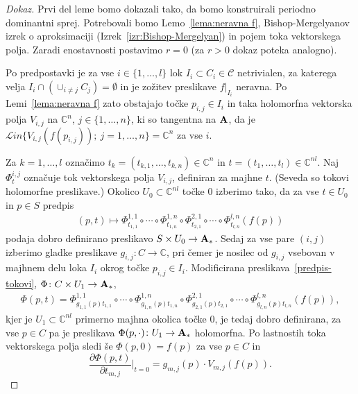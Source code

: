 \documentclass[12pt,a4paper,twoside]{article}
\theoremstyle{definition} %
\newenvironment{dokaz}[1][Dokaz]{\begin{proof}[#1]}{\end{proof}}
\theoremstyle{plain} %
\numberwithin{equation}{section}  %
\newcommand{\C}{\mathbb C}
\begin{document}
\begin{dokaz}
Prvi del leme bomo dokazali tako, da bomo konstruirali periodno dominantni sprej. Potrebovali bomo Lemo~\ref{lema:neravna f}, Bishop-Mergelyanov izrek o aproksimaciji (Izrek~\ref{izr:Bishop-Mergelyan}) in pojem toka vektorskega polja.
Zaradi enostavnosti postavimo $r=0$ (za $r>0$ dokaz poteka analogno).

Po predpostavki je za vse $i \in \{ 1, \dots, l \}$ lok $I_{i} \subset C_{i} \in \mathcal{C}$ netrivialen, za katerega velja $I_{i} \cap (\cup_{i \neq j} C_{j}) = \emptyset$ in je zožitev preslikave $f|_{I_{i}}$ neravna. Po Lemi~\ref{lema:neravna f} zato obstajajo točke $p_{i,j} \in I_{i}$ in taka holomorfna vektorska polja $V_{i,j}$ na $\C^{n}$, $j \in \{1, \dots, n \}$, ki so tangentna na $\textbf{\textup{A}}$, da je $\mathcal{L}in \{ V_{i,j}(f(p_{i,j})) ; \ j = 1, \dots, n \} = \C^{n}$ za vse $i$.

Za $k = 1, \dots , l$ označimo $t_{k} = (t_{k,1}, \dots, t_{k,n}) \in \C^{n}$ in $t = (t_{1}, \dots, t_{l}) \in \C^{nl}$. Naj $\Phi_{t}^{i,j}$ označuje tok vektorskega polja $V_{i,j}$, definiran za majhne $t$. (Seveda so tokovi holomorfne preslikave.)
Okolico $U_{0} \subset \C^{nl}$ točke $0$ izberimo tako, da za vse $t \in U_{0}$ in $p \in S$ predpis
\begin{gather} \label{predpis-tokovi}
(p, t) \mapsto \Phi_{t_{1,1}}^{1,1} \circ \cdots \circ \Phi_{t_{1,n}}^{1,n} \circ \Phi_{t_{2,1}}^{2,1} \circ \cdots \circ \Phi_{t_{l,n}}^{l,n} (f(p))
\end{gather}
podaja dobro definirano preslikavo $S \times U_{0} \to \textbf{\textup{A}}_{*}$.
Sedaj za vse pare $(i,j)$ izberimo gladke preslikave $g_{i,j} \colon C \to \C$, pri čemer je nosilec od $g_{i,j}$ vsebovan v majhnem delu loka $I_{i}$ okrog točke $p_{i,j} \in I_{i}$.
Modificirana preslikava~\eqref{predpis-tokovi}, $\Phi \colon C \times U_{1} \to \textbf{\textup{A}}_{*}$,
\begin{gather} \label{predpis-Phi}
\Phi(p,t) = \Phi_{g_{1,1}(p)t_{1,1}}^{1,1} \circ \cdots \circ \Phi_{g_{1,n}(p)t_{1,n}}^{1,n} \circ \Phi_{g_{2,1}(p)t_{2,1}}^{2,1} \circ \cdots \circ \Phi_{g_{l,n}(p)t_{l,n}}^{l,n} (f(p)),
\end{gather}
kjer je $U_{1} \subset \C^{nl}$ primerno majhna okolica točke $0$, je tedaj dobro definirana, za vse $p \in C$ pa je preslikava $\Phi(p, \cdot) \colon U_{1} \to \textbf{\textup{A}}_{*}$ holomorfna. Po lastnostih toka vektorskega polja sledi še $\Phi(p,0) = f(p)$ za vse $p \in C$ in
\begin{equation} \label{dPhi/dt}
\frac{\partial \Phi(p,t)}{\partial t_{m,j}} \Big|_{t=0} = g_{m,j}(p) \cdot V_{m,j}(f(p)).
\end{equation}


\end{dokaz}
\end{document}
